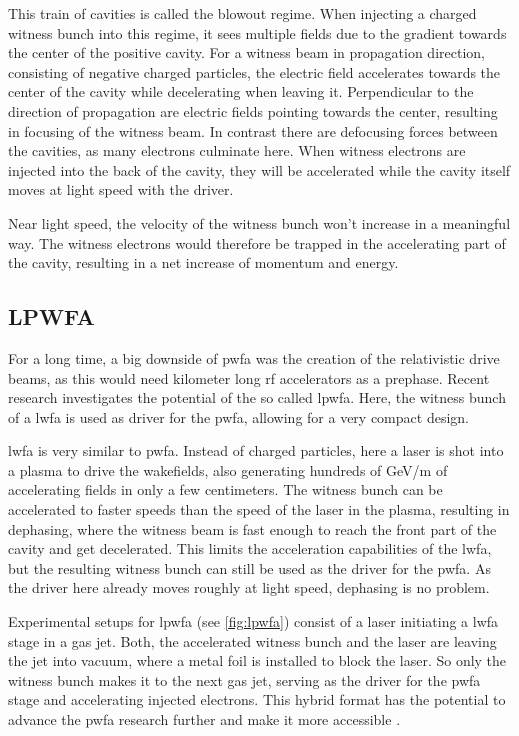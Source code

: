 \documentclass[bachelor_thesis]{subfiles}
\begin{document}
This train of cavities is called the blowout regime. When injecting a charged witness bunch into this regime, it sees multiple fields due to the gradient towards the center of the positive cavity. For a witness beam in propagation direction, 
consisting of negative charged particles, the electric field accelerates towards the center of the cavity while decelerating when leaving it. Perpendicular to the direction of propagation are electric fields pointing towards the center, resulting in focusing of the witness beam. 
In contrast there are defocusing forces between the cavities, as many electrons culminate here. When witness electrons are injected into the back of the cavity, they will be accelerated while the cavity itself moves at light speed with the driver.

Near light speed, the velocity of the witness bunch won't increase in a meaningful way. The witness electrons would therefore be trapped in the accelerating part of the cavity, resulting in a net increase of momentum and energy.

\subsection{LPWFA} \label{chap:lpfwa}
For a long time, a big downside of \gls{pwfa} was the creation of the relativistic drive beams, as this would need kilometer long \gls{rf} accelerators as a prephase. Recent research \cite{Kurz2021} investigates the potential of the so called \gls{lpwfa}.
Here, the witness bunch of a \gls{lwfa} is used as driver for the \gls{pwfa}, allowing for a very compact design.

\Gls{lwfa} is very similar to \gls{pwfa}. Instead of charged particles, here a laser is shot into a plasma to drive the wakefields, also generating hundreds of \unit{\GeV/\m} of accelerating fields in only a few centimeters.
The witness bunch can be accelerated to faster speeds than the speed of the laser in the plasma, resulting in dephasing, where the witness beam is fast enough to reach the front part of the cavity and get decelerated. This limits the acceleration capabilities of the \gls{lwfa},
 but the resulting witness bunch can still be used as the driver for the \gls{pwfa}. As the driver here already moves roughly at light speed, dephasing is no problem. 

Experimental setups for \gls{lpwfa} (see \autoref{fig:lpwfa}) consist of a laser initiating a \gls{lwfa} stage in a gas jet. Both, the accelerated witness bunch and the laser are leaving the jet into vacuum, where a metal foil is installed to block the laser. 
So only the witness bunch makes it to the next gas jet, serving as the driver for the \gls{pwfa} stage and accelerating injected electrons. 
This hybrid format has the potential to advance the \gls{pwfa} research further and make it more accessible \cite{Kurz2021}.
\end{document}
